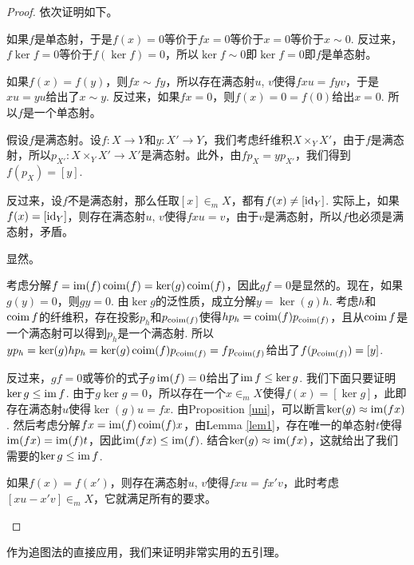 \begin{proof}
依次证明如下。
\begin{compactenum}[~~~(1)]
\item 如果$f$是单态射，于是$f(x)=0$等价于$fx=0$等价于$x=0$等价于$x\sim 0$. 反过来，$f\ker f=0$等价于$f(\ker f)=0$，所以$\ker f\sim 0$即$\ker f=0$即$f$是单态射。

\item 如果$f(x)=f(y)$，则$fx\sim fy$，所以存在满态射$u$, $v$使得$fxu=fyv$，于是$xu=yu$给出了$x\sim y$. 反过来，如果$fx=0$，则$f(x)=0=f(0)$给出$x=0$. 所以$f$是一个单态射。

\item 假设$f$是满态射。设$f:X\to Y$和$y:X'\to Y$，我们考虑纤维积$X\times_Y X'$，由于$f$是满态射，所以$p_{X'}:X\times_Y X'\to X'$是满态射。此外，由$fp_X=yp_{X'}$，我们得到$f(p_X)=[y]$. 

反过来，设$f$不是满态射，那么任取$[x]\in_m X$，都有$f(x)\neq [\operatorname{id}_Y]$. 实际上，如果$f(x)=[\operatorname{id}_Y]$，则存在满态射$u$, $v$使得$fxu=v$，由于$v$是满态射，所以$f$也必须是满态射，矛盾。

\item 显然。

\item 考虑分解$f=\operatorname{im}(f)\operatorname{coim}(f)=\ker(g)\operatorname{coim}(f)$，因此$gf=0$是显然的。现在，如果$g(y)=0$，则$gy=0$. 由$\ker g$的泛性质，成立分解$y=\ker(g)h$. 考虑$h$和$\operatorname{coim} f$的纤维积，存在投影$p_h$和$p_{\operatorname{coim}(f)}$使得$hp_h=\operatorname{coim}(f)p_{\operatorname{coim}(f)}$，且从$\operatorname{coim} f$是一个满态射可以得到$p_h$是一个满态射. 所以$yp_h=\ker(g)hp_h=\ker(g)\operatorname{coim}(f)p_{\operatorname{coim}(f)}=fp_{\operatorname{coim}(f)}$给出了$f(p_{\operatorname{coim}(f)})=[y]$.

反过来，$gf=0$或等价的式子$g\operatorname{im}(f)=0$给出了$\operatorname{im} f \leq \ker g$. 我们下面只要证明$\ker g \leq \operatorname{im} f$. 由于$g\ker g=0$，所以存在一个$x\in_m X$使得$f(x)=[\ker g]$，此即存在满态射$u$使得$\ker(g)u=fx$. 由Proposition \ref{uni}，可以断言$\ker(g)\approx \operatorname{im}(fx)$. 然后考虑分解$fx=\operatorname{im}(f)\operatorname{coim}(f)x$，由Lemma \ref{lem1}，存在唯一的单态射$t$使得$\operatorname{im}(fx)=\operatorname{im}(f)t$，因此$\operatorname{im}(fx)\leq \operatorname{im}(f)$. 结合$\ker(g)\approx \operatorname{im}(fx)$，这就给出了我们需要的$\ker g\leq \operatorname{im} f$.

\item 如果$f(x)=f(x')$，则存在满态射$u$, $v$使得$fxu=fx'v$，此时考虑$[xu-x'v]\in_m X$，它就满足所有的要求。\qedhere
\end{compactenum}
\end{proof}

作为追图法的直接应用，我们来证明非常实用的五引理。

